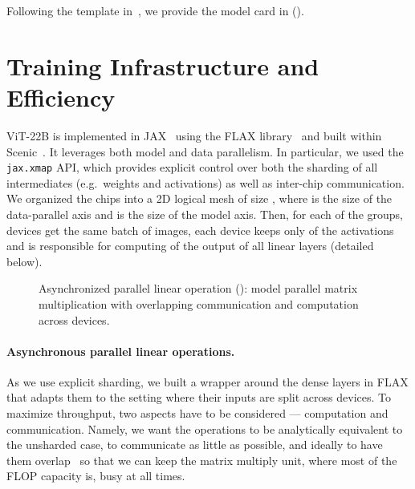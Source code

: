 \documentclass{article}
\newcommand{\chonk}{\mbox{ViT-22B}\xspace}
\begin{document}
Following the template in~\citet{mitchell2019model}, we provide the model card in  ().
%
 \section{Training Infrastructure and Efficiency}

\chonk is implemented in JAX~\citep{jax2018github} using the FLAX library~\citep{flax2020github} and built within Scenic~\citep{dehghani2021scenic}. It leverages both model and data parallelism. In particular, we used the \texttt{jax.xmap} API, which provides explicit control over both the sharding of all intermediates (e.g.\ weights and activations) as well as inter-chip communication.
We organized the chips into a 2D logical mesh of size , where  is the size of the data-parallel axis and  is the size of the model axis.
Then, for each of the  groups,  devices get the same batch of images, each device keeps only  of the activations and is responsible for computing  of the output of all linear layers (detailed below).

\begin{figure}[ht]
    \centering
    \vspace{-10pt}
    \caption{Asynchronized parallel linear operation (): model parallel matrix multiplication with overlapping communication and computation across devices.}
\label{fig:vit22b_async_linear}
\end{figure}

\paragraph{Asynchronous parallel linear operations.}
As we use explicit sharding, we built a wrapper around the dense layers in FLAX that adapts them to the setting where their inputs are split across  devices.
To maximize throughput, two aspects have to be considered --- computation and communication.
Namely, we want the operations to be analytically equivalent to the unsharded case, to communicate as little as possible, and ideally to have them overlap~\citep{wang2022overlap} so that we can keep the matrix multiply unit, where most of the FLOP capacity is, busy at all times.
\end{document}
